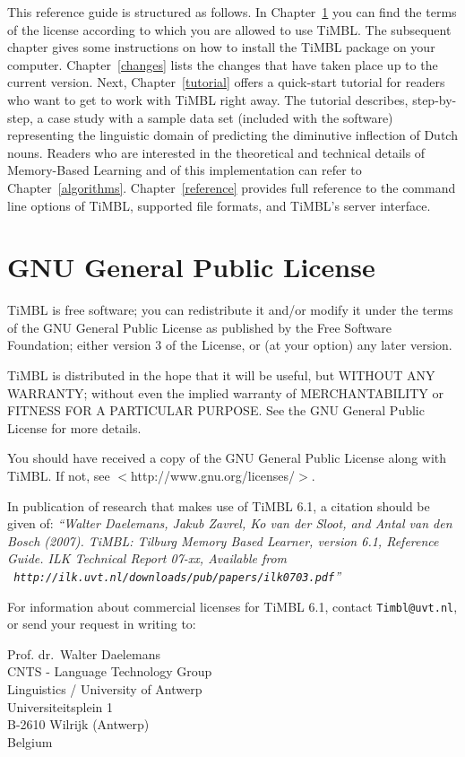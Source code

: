 \documentclass{report}
\begin{document}
This reference guide is structured as follows. In
Chapter~\ref{license} you can find the terms of the license according
to which you are allowed to use TiMBL. The subsequent chapter gives
some instructions on how to install the TiMBL package on your
computer. Chapter~\ref{changes} lists the changes that have taken
place up to the current version. Next, Chapter~\ref{tutorial} offers a
quick-start tutorial for readers who want to get to work with TiMBL
right away. The tutorial describes, step-by-step, a case study with a
sample data set (included with the software) representing the
linguistic domain of predicting the diminutive inflection of Dutch
nouns.  Readers who are interested in the theoretical and technical
details of Memory-Based Learning and of this implementation can refer
to Chapter~\ref{algorithms}. Chapter~\ref{reference} provides full
reference to the command line options of TiMBL, supported file
formats, and TiMBL's server interface.

\chapter{GNU General Public License}
\label{license}

TiMBL is free software; you can redistribute it and/or modify it under
the terms of the GNU General Public License as published by the Free
Software Foundation; either version 3 of the License, or (at your
option) any later version.

TiMBL is distributed in the hope that it will be useful, but WITHOUT
ANY WARRANTY; without even the implied warranty of MERCHANTABILITY or
FITNESS FOR A PARTICULAR PURPOSE.  See the GNU General Public License
for more details.

You should have received a copy of the GNU General Public License
along with TiMBL.  If not, see $<$http://www.gnu.org/licenses/$>$.

In publication of research that makes use of TiMBL 6.1, a citation
should be given of: {\em ``Walter Daelemans, Jakub Zavrel, Ko van der
  Sloot, and Antal van den Bosch (2007). TiMBL: Tilburg Memory Based
  Learner, version 6.1, Reference Guide. ILK Technical Report 07-xx,
  Available from \\ {\tt
    http://ilk.uvt.nl/downloads/pub/papers/ilk0703.pdf}''}

For information about commercial licenses for TiMBL 6.1,
contact {\tt Timbl@uvt.nl}, or send your request in writing to:

Prof. dr.~Walter Daelemans\\
CNTS - Language Technology Group\\
Linguistics / University of Antwerp\\
Universiteitsplein 1\\
B-2610 Wilrijk (Antwerp)\\
Belgium
\end{document}
